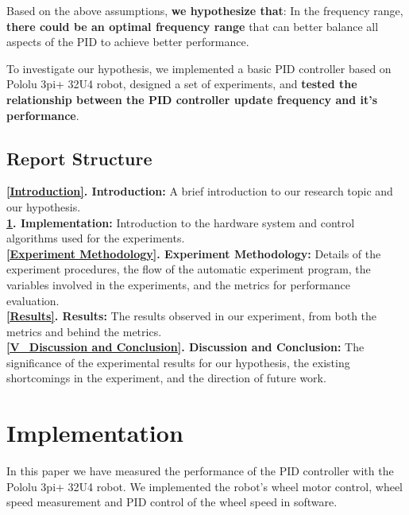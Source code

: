 \documentclass[conference]{IEEEtran}
\begin{document}
Based on the above assumptions, \textbf{we hypothesize that}: In the frequency range, \textbf{there could be an optimal frequency range} that can better balance all aspects of the PID to achieve better performance.


To investigate our hypothesis, we implemented a basic PID controller based on Pololu 3pi+ 32U4 robot, designed a set of experiments, and \textbf{tested the relationship between the PID controller update frequency and it's performance}.
\subsection{Report Structure}
\begin{enumerate}
    \textbf{\ref{Introduction}. Introduction:} A brief introduction to our research topic and our hypothesis.
    \\\textbf{\ref{Implementation}. Implementation:} Introduction to the hardware system and control algorithms used for the experiments.
    \\\textbf{\ref{Experiment Methodology}. Experiment Methodology:} Details of the experiment procedures, the flow of the automatic experiment program, the variables involved in the experiments, and the metrics for performance evaluation.
    \\\textbf{\ref{Results}. Results:} The results observed in our experiment, from both the metrics and behind the metrics.
    \\\textbf{\ref{V_Discussion and Conclusion}. Discussion and Conclusion:} The significance of the experimental results for our hypothesis, the existing shortcomings in the experiment, and the direction of future work.
\end{enumerate}





\section{Implementation}
\label{Implementation}
In this paper we have measured the performance of the PID controller with the Pololu 3pi+ 32U4 robot. We implemented the robot's wheel motor control, wheel speed measurement and PID control of the wheel speed in software.
\end{document}

